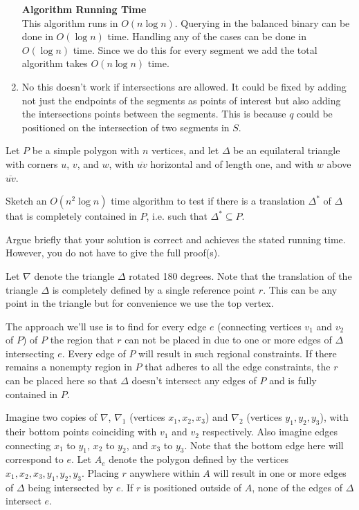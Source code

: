 \documentclass{article}
\newcommand{\withpoints}[1]{%
  \addtocounter{pointscounter}{#1} \printpoints{#1}
}
\newcommand{\printpoints}[1]{%
   \ifthenelse{#1 = 0}
              {}
              {\textit{(#1 points)}}\mbox{}
}
\newenvironment{question}[1][0]{\begin{tcolorbox}[parbox=false
                                      ,breakable=true
                                      ,enhanced jigsaw
                                      ,title=\bfseries Question
                                      \stepcounter{questionscounter}\arabic{questionscounter}
                                      \withpoints{#1}]
                         }
                         {\end{tcolorbox}}
\begin{document}
\begin{enumerate}
    \textbf{Algorithm Running Time} \\
    This algorithm runs in $O(n \log n)$. Querying in the balanced binary can be done in $O(\log n)$ time. Handling any of the cases can be done in $O(\log n)$ time.
    Since we do this for every segment we add the total algorithm takes $O(n\log n)$ time.

    \item No this doesn't work if intersections are allowed. It could be fixed by adding not just the endpoints of the segments as points of interest but also adding the intersections points between the segments.
    This is because $q$ could be positioned on the intersection of two segments in $S$.
  \end{enumerate}
  

  \begin{question}[20] Let $P$ be a simple polygon with $n$ vertices,
    and let $\Delta$ be an equilateral triangle with corners $u$, $v$, and
    $w$, with $\overline{uv}$ horizontal and of length one, and with $w$
    above $\overline{uv}$.

    Sketch an $O(n^2\log n)$ time algorithm to test if there is a
    translation $\Delta^*$ of $\Delta$ that is completely contained in $P$,
    i.e. such that $\Delta^* \subseteq P$.

    Argue briefly that your solution is correct and achieves the
    stated running time. However, you do not have to give the full
    proof(s).

  \end{question}

  Let $\nabla$ denote the triangle $\Delta$ rotated 180 degrees.
  Note that the translation of the triangle $\Delta$ is completely defined by a single reference point $r$. This can be any point in the triangle but for convenience we use the top vertex.


  The approach we'll use is to find for every edge $e$ (connecting vertices $v_1$ and $v_2$ of $P$) of $P$ the region that $r$ can not be placed in due to one or more edges of $\Delta$ intersecting $e$.
  Every edge of $P$ will result in such regional constraints. If there remains a nonempty region in $P$ that adheres to all the edge constraints, the $r$ can be placed here so that $\Delta$ doesn't intersect any edges of $P$ and is fully contained in $P$.

  Imagine two copies of $\nabla$, $\nabla_1$ (vertices $x_1, x_2, x_3$) and $\nabla_2$ (vertices $y_1, y_2, y_3$), with their bottom points coinciding with $v_1$ and $v_2$ respectively. 
  Also imagine edges connecting $x_1$ to $y_1$, $x_2$ to $y_2$, and $x_3$ to $y_3$. 
  Note that the bottom edge here will correspond to $e$. 
  Let $A_e$ denote the polygon defined by the vertices $x_1, x_2, x_3, y_1, y_2, y_3$.
  Placing $r$ anywhere within $A$ will result in one or more edges of $\Delta$ being intersected by $e$. If $r$ is positioned outside of $A$, none of the edges of $\Delta$ intersect $e$.
\end{document}
